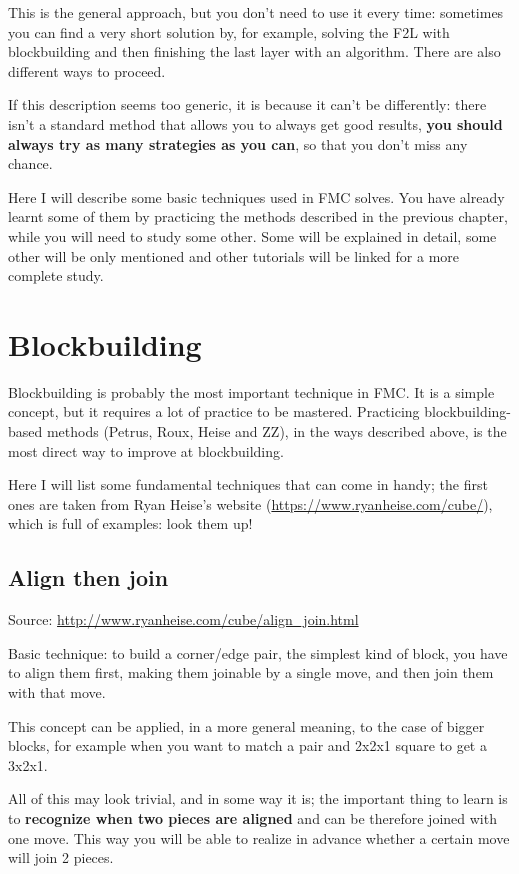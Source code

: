 \documentclass[11pt,a4paper]{book}
\begin{document}
This is the general approach, but you don't need to use it every time: sometimes you can find a very short solution by, for example, solving the F2L with blockbuilding and then finishing the last layer with an algorithm. There are also different ways to proceed.

If this description seems too generic, it is because it can't be differently: there isn't a standard method that allows you to always get good results, \textbf{you should always try as many strategies as you can}, so that you don't miss any chance.

Here I will describe some basic techniques used in FMC solves. You have already learnt some of them by practicing the methods described in the previous chapter, while you will need to study some other. Some will be explained in detail, some other will be only mentioned and other tutorials will be linked for a more complete study.

\section{Blockbuilding}

Blockbuilding is probably the most important technique in FMC. It is a simple concept, but it requires a lot of practice to be mastered. Practicing blockbuilding-based methods (Petrus, Roux, Heise and ZZ), in the ways described above, is the most direct way to improve at blockbuilding.

Here I will list some fundamental techniques that can come in handy; the first ones are taken from Ryan Heise's website (\url{https://www.ryanheise.com/cube/}), which is full of examples: look them up!

\subsection{Align then join}
\label{align-join}
Source: \url{http://www.ryanheise.com/cube/align_join.html}\bigskip

Basic technique: to build a corner/edge pair, the simplest kind of block, you have to align them first, making them joinable by a single move, and then join them with that move.

This concept can be applied, in a more general meaning, to the case of bigger blocks, for example when you want to match a pair and 2x2x1 square to get a 3x2x1.

All of this may look trivial, and in some way it is; the important thing to learn is to \textbf{recognize when two pieces are aligned} and can be therefore joined with one move. This way you will be able to realize in advance whether a certain move will join 2 pieces.
\end{document}
